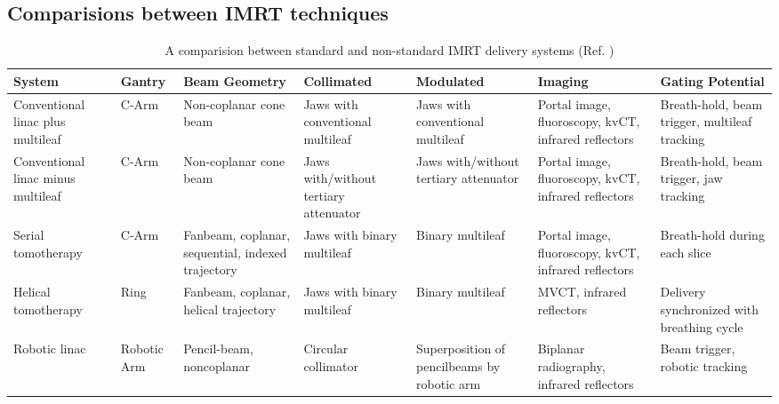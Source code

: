 \documentclass[10pt,journal,compsoc]{IEEEtran} %
\begin{document}
  \subsection{Comparisions between IMRT techniques}
  \label{comparisions}
    \begin{table}[t!]
      \centering
      \caption{A comparision between standard and non-standard IMRT delivery 
      systems (Ref. \cite{Fenwick2006})}
      \small{
      \begin{tabulary}{\linewidth}{LLLLLLL}
        \toprule[0.04cm]
        \textbf{System} & \textbf{Gantry} & \textbf{ Beam Geometry} & 
        \textbf{Collimated} & \textbf{Modulated} & \textbf{Imaging} & 
        \textbf{Gating
          Potential} \\\toprule[0.04cm]
        
        Conventional linac plus multileaf & C-Arm & Non-coplanar cone beam & 
        Jaws 
        with conventional
        multileaf & Jaws with conventional
        multileaf & Portal image, fluoroscopy, kvCT, 
        infrared 
        reflectors &
        Breath-hold, 
        beam trigger, multileaf tracking \bigstrut\\\midrule
        Conventional linac minus multileaf & C-Arm & Non-coplanar cone beam & 
        Jaws with/without tertiary attenuator
        & Jaws with/without tertiary attenuator
        & Portal image, fluoroscopy, kvCT, infrared 
        reflectors & Breath-hold,
        beam trigger,
        jaw tracking \bigstrut\\\midrule
        Serial tomotherapy & C-Arm & Fanbeam, coplanar, sequential,
        indexed trajectory & Jaws with binary
        multileaf & Binary multileaf & Portal image, 
        fluoroscopy, kvCT, infrared reflectors & Breath-hold
        during each
        slice \bigstrut\\\midrule
        Helical tomotherapy & Ring  &  Fanbeam,
        coplanar, helical
        trajectory & Jaws with binary
        multileaf & Binary multileaf & MVCT, infrared 
        reflectors & Delivery
        synchronized
        with breathing
        cycle \bigstrut \\\midrule
        Robotic linac & Robotic Arm &  Pencil-beam,
        noncoplanar & Circular collimator & Superposition of pencilbeams by 
        robotic arm & Biplanar radiography, infrared 
        reflectors & Beam 
        trigger,
        robotic
        tracking \bigstrut \\
        \bottomrule
      \end{tabulary}}%
    
      \label{tab:compare}%
    \end{table}%
\end{document}
